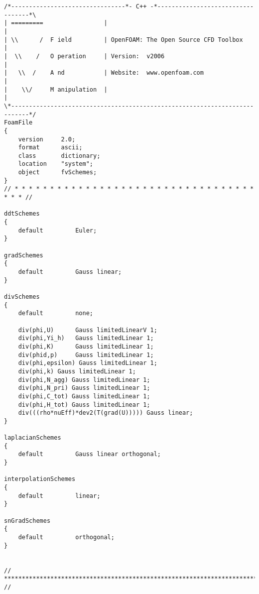 \begin{lstlisting}[style=cpp,title=\texttt{system/fvSchemes},captionpos=t]
/*--------------------------------*- C++ -*----------------------------------*\
| =========                 |                                                 |
| \\      /  F ield         | OpenFOAM: The Open Source CFD Toolbox           |
|  \\    /   O peration     | Version:  v2006                                 |
|   \\  /    A nd           | Website:  www.openfoam.com                      |
|    \\/     M anipulation  |                                                 |
\*---------------------------------------------------------------------------*/
FoamFile
{
    version     2.0;
    format      ascii;
    class       dictionary;
    location    "system";
    object      fvSchemes;
}
// * * * * * * * * * * * * * * * * * * * * * * * * * * * * * * * * * * * * * //

ddtSchemes
{
    default         Euler;
}

gradSchemes
{
    default         Gauss linear;
}

divSchemes
{
    default         none;

    div(phi,U)      Gauss limitedLinearV 1;
    div(phi,Yi_h)   Gauss limitedLinear 1;
    div(phi,K)      Gauss limitedLinear 1;
    div(phid,p)     Gauss limitedLinear 1;
    div(phi,epsilon) Gauss limitedLinear 1;
    div(phi,k) Gauss limitedLinear 1;
    div(phi,N_agg) Gauss limitedLinear 1;
    div(phi,N_pri) Gauss limitedLinear 1;
    div(phi,C_tot) Gauss limitedLinear 1;
    div(phi,H_tot) Gauss limitedLinear 1;
    div(((rho*nuEff)*dev2(T(grad(U))))) Gauss linear;
}

laplacianSchemes
{
    default         Gauss linear orthogonal;
}

interpolationSchemes
{
    default         linear;
}

snGradSchemes
{
    default         orthogonal;
}


// ************************************************************************* //

\end{lstlisting}


